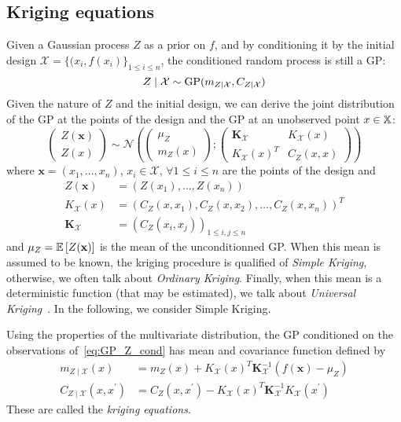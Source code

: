 \documentclass[../../Main_ManuscritThese.tex]{subfiles}
\begin{document}
\subsection{Kriging equations}
\label{sec:krigin_equations}
Given a Gaussian process $Z$ as a prior on $f$, and by conditioning it by the initial design $\mathcal{X} = \{(x_i, f(x_i)\}_{1 \leq i \leq n}$, the conditioned random process is still a GP:
\begin{equation}
  \label{eq:GP_Z_cond}
  Z \mid \mathcal{X} \sim \operatorname{\mathrm{GP}}(m_{Z\mid \mathcal{X}}, C_{Z\mid \mathcal{X}})
\end{equation}
Given the nature of $Z$ and the initial design, we can derive the
joint distribution of the GP at the points of the design and the GP at
an unobserved point $x \in \mathbb{X}$:
\begin{equation}
  \label{eq:GP_joint_distrib}
  \begin{pmatrix}
    Z(\mathbf{x}) \\
    Z(x)
  \end{pmatrix} \sim
  \mathcal{N}\left(
    \begin{pmatrix}
      \mu_Z \\
      m_{Z}(x)
    \end{pmatrix} ;
    \begin{pmatrix}
      \mathbf{K}_{\mathcal{X}} & K_{\mathcal{X}}(x) \\
       K_{\mathcal{X}}(x)^T & C_Z(x, x)
    \end{pmatrix}
\right)
\end{equation}
where $\mathbf{x} = (x_1,\dots,x_n)$, $x_i\in\mathcal{X}$, $\forall 1\leq i\leq n$ are the points of the design and
\begin{align}
   Z(\mathbf{x}) &= (Z({x}_1),\dots,Z({x}_n)) \\
  K_{\mathcal{X}}(x) &= \left(C_Z(x, x_1),C_Z(x, x_2),\dots,C_Z(x,x_n)\right)^T \\
  \mathbf{K}_{\mathcal{X}} &= \left(C_Z(x_i, x_j)\right)_{1 \leq i,j \leq n}
\end{align}
and $\mu_Z = \mathbb{E}\left[Z(\mathbf{x})\right]$ is the mean of the
unconditionned GP. When this mean is assumed to be known, the kriging
procedure is qualified of \emph{Simple Kriging}, otherwise, we often
talk about \emph{Ordinary Kriging}. Finally, when this mean is a
deterministic function (that may be estimated), we talk about
\emph{Universal Kriging}~\citep{le_riche_introduction_2014}. In the
following, we consider Simple Kriging.

Using the properties of the multivariate distribution, the GP conditioned on the observations of~\eqref{eq:GP_Z_cond} has mean and covariance function defined by
\begin{align}
  m_{Z \mid \mathcal{X}}(x) &= m_Z(x) + K_{\mathcal{X}}(x)^T \mathbf{K}_{\mathcal{X}}^{-1}(f(\mathbf{x}) - \mu_Z ) \\
  C_{Z\mid \mathcal{X}}(x, x^\prime) &= C_Z(x, x^\prime)  - K_{\mathcal{X}}(x)^T\mathbf{K}_{\mathcal{X}}^{-1}K_{\mathcal{X}}(x^\prime)
\end{align}
These are called the \emph{kriging equations}.
\end{document}
